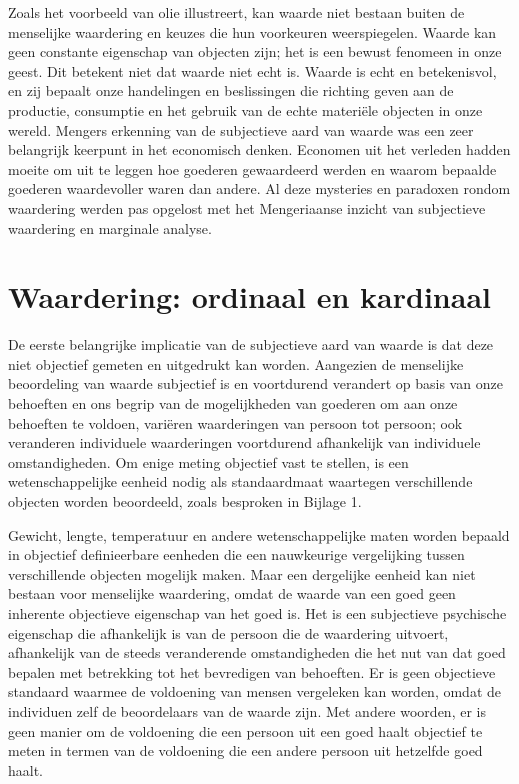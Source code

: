 \documentclass[
  a5paper,
  smalldemyvopaper,11pt,twoside,onecolumn,openright,extrafontsizes,
hidelinks]{memoir}
\begin{document}
Zoals het voorbeeld van olie illustreert, kan waarde niet bestaan buiten
de menselijke waardering en keuzes die hun voorkeuren weerspiegelen.
Waarde kan geen constante eigenschap van objecten zijn; het is een
bewust fenomeen in onze geest. Dit betekent niet dat waarde niet echt
is. Waarde is echt en betekenisvol, en zij bepaalt onze handelingen en
beslissingen die richting geven aan de productie, consumptie en het
gebruik van de echte materiële objecten in onze wereld. Mengers
erkenning van de subjectieve aard van waarde was een zeer belangrijk
keerpunt in het economisch denken. Economen uit het verleden hadden
moeite om uit te leggen hoe goederen gewaardeerd werden en waarom
bepaalde goederen waardevoller waren dan andere. Al deze mysteries en
paradoxen rondom waardering werden pas opgelost met het Mengeriaanse
inzicht van subjectieve waardering en marginale analyse.

\section{Waardering: ordinaal en
kardinaal}\label{waardering-ordinaal-en-kardinaal}

De eerste belangrijke implicatie van de subjectieve aard van waarde is
dat deze niet objectief gemeten en uitgedrukt kan worden. Aangezien de
menselijke beoordeling van waarde subjectief is en voortdurend verandert
op basis van onze behoeften en ons begrip van de mogelijkheden van
goederen om aan onze behoeften te voldoen, variëren waarderingen van
persoon tot persoon; ook veranderen individuele waarderingen voortdurend
afhankelijk van individuele omstandigheden. Om enige meting objectief
vast te stellen, is een wetenschappelijke eenheid nodig als
standaardmaat waartegen verschillende objecten worden beoordeeld, zoals
besproken in Bijlage 1.

Gewicht, lengte, temperatuur en andere wetenschappelijke maten worden
bepaald in objectief definieerbare eenheden die een nauwkeurige
vergelijking tussen verschillende objecten mogelijk maken. Maar een
dergelijke eenheid kan niet bestaan voor menselijke waardering, omdat de
waarde van een goed geen inherente objectieve eigenschap van het goed
is. Het is een subjectieve psychische eigenschap die afhankelijk is van
de persoon die de waardering uitvoert, afhankelijk van de steeds
veranderende omstandigheden die het nut van dat goed bepalen met
betrekking tot het bevredigen van behoeften. Er is geen objectieve
standaard waarmee de voldoening van mensen vergeleken kan worden, omdat
de individuen zelf de beoordelaars van de waarde zijn. Met andere
woorden, er is geen manier om de voldoening die een persoon uit een goed
haalt objectief te meten in termen van de voldoening die een andere
persoon uit hetzelfde goed haalt.
\end{document}
